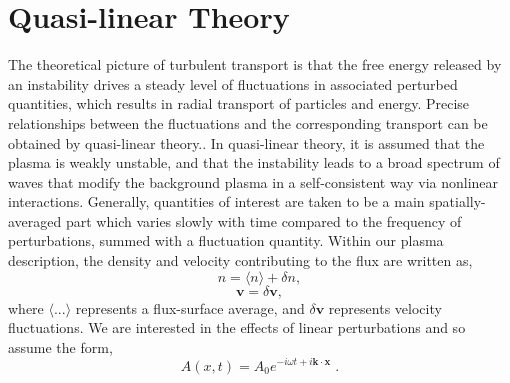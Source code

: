 \documentclass[12pt]{article}
\numberwithin{equation}{subsection}
\begin{document}
\section{Quasi-linear Theory}
   \quad The theoretical picture of turbulent transport is that the free energy released by an instability drives a steady level of
fluctuations in associated perturbed quantities, which results in radial transport of particles and energy. Precise relationships
between the fluctuations and the corresponding transport can be obtained by quasi-linear theory.\cite{WessonD}. In quasi-linear
theory, it is assumed that the plasma is weakly unstable, and that the instability leads to a broad spectrum of waves that modify
the background plasma in a self-consistent way via nonlinear interactions\cite{GurnBhatA}. Generally, quantities of interest are taken
to be a main spatially-averaged part which varies slowly with time compared to the frequency of perturbations, summed with a fluctuation
quantity. Within our plasma description, the density and velocity contributing to the flux are written as, 
   \begin{equation}
      n = \langle n \rangle + \delta n,
   \end{equation}
   \begin{equation}
      \bm{v} = \delta \bm{v},
   \end{equation}
where $\langle ... \rangle$ represents a flux-surface average, and $\delta \bm{v}$ represents velocity fluctuations. We are interested in
the effects of linear perturbations and so assume the form,   
   \begin{equation}
      A(x,t) = A_0e^{-i\omega t + i\bm{k}\cdot\bm{x}}\;.
   \end{equation}
\end{document}
